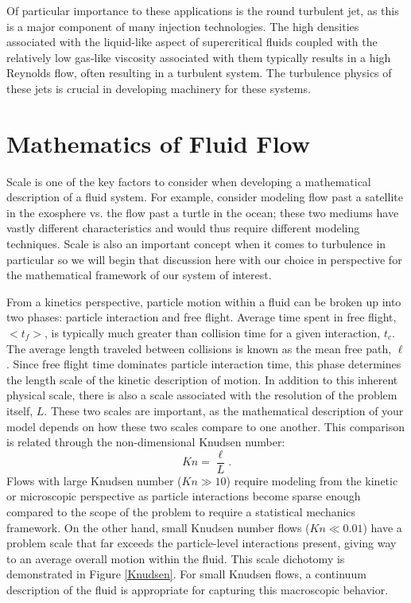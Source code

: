 Of particular importance to these applications is the round turbulent jet, as this is a major component of many injection technologies. The high densities associated with the liquid-like aspect of supercritical fluids coupled with the relatively low gas-like viscosity associated with them typically results in a high Reynolds flow, often resulting in a turbulent system. The turbulence physics of these jets is crucial in developing machinery for these systems. 

\section{Mathematics of Fluid Flow}

Scale is one of the key factors to consider when developing a mathematical description of a fluid system. For example, consider modeling flow past a satellite in the exosphere vs. the flow past a turtle in the ocean; these two mediums have vastly different characteristics and would thus require different modeling techniques. Scale is also an important concept when it comes to turbulence in particular so we will begin that discussion here with our choice in perspective for the mathematical framework of our system of interest.

From a kinetics perspective, particle motion within a fluid can be broken up into two phases: particle interaction and free flight. Average time spent in free flight, $<t_f>$, is typically much greater than collision time for a given interaction, $t_c$. The average length traveled between collisions is known as the mean free path, $\ell$.  Since free flight time dominates particle interaction time, this phase determines the length scale of the kinetic description of motion. In addition to this inherent physical scale, there is also a scale associated with the resolution of the problem itself, $L$. These two scales are important, as the mathematical description of your model depends on how these two scales compare to one another. This comparison is related through the non-dimensional Knudsen number: 
\begin{equation}\label{Knudsen}
Kn = \dfrac{\ell}{L}.
\end{equation} 
Flows with large Knudsen number ($Kn \gg 10$) require modeling from the kinetic or microscopic perspective as particle interactions become sparse enough compared to the scope of the problem to require a statistical mechanics framework. On the other hand, small Knudsen number flows ($Kn \ll 0.01$) have a problem scale that far exceeds the particle-level interactions present, giving way to an average overall motion within the fluid. This scale dichotomy is demonstrated in Figure \ref{Knudsen}. For small Knudsen flows, a continuum description of the fluid is appropriate for capturing this macroscopic behavior. 

